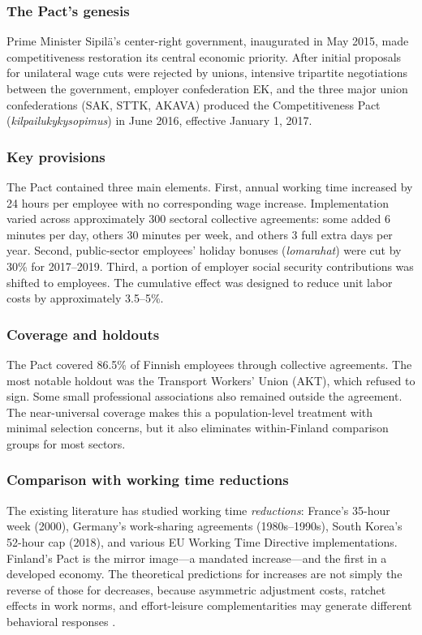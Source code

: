 \documentclass[12pt]{article}
\begin{document}
\subsubsection*{The Pact's genesis} Prime Minister Sipil\"a's center-right government, inaugurated in May 2015, made competitiveness restoration its central economic priority. After initial proposals for unilateral wage cuts were rejected by unions, intensive tripartite negotiations between the government, employer confederation EK, and the three major union confederations (SAK, STTK, AKAVA) produced the Competitiveness Pact (\textit{kilpailukykysopimus}) in June 2016, effective January 1, 2017.

\subsubsection*{Key provisions} The Pact contained three main elements. First, annual working time increased by 24 hours per employee with no corresponding wage increase. Implementation varied across approximately 300 sectoral collective agreements: some added 6 minutes per day, others 30 minutes per week, and others 3 full extra days per year. Second, public-sector employees' holiday bonuses (\textit{lomarahat}) were cut by 30\% for 2017--2019. Third, a portion of employer social security contributions was shifted to employees. The cumulative effect was designed to reduce unit labor costs by approximately 3.5--5\%.

\subsubsection*{Coverage and holdouts} The Pact covered 86.5\% of Finnish employees through collective agreements. The most notable holdout was the Transport Workers' Union (AKT), which refused to sign. Some small professional associations also remained outside the agreement. The near-universal coverage makes this a population-level treatment with minimal selection concerns, but it also eliminates within-Finland comparison groups for most sectors.

\subsubsection*{Comparison with working time reductions} The existing literature has studied working time \textit{reductions}: France's 35-hour week (2000), Germany's work-sharing agreements (1980s--1990s), South Korea's 52-hour cap (2018), and various EU Working Time Directive implementations. Finland's Pact is the mirror image---a mandated increase---and the first in a developed economy. The theoretical predictions for increases are not simply the reverse of those for decreases, because asymmetric adjustment costs, ratchet effects in work norms, and effort-leisure complementarities may generate different behavioral responses \citep{cardoso2012, hamermesh2015}.
\end{document}
